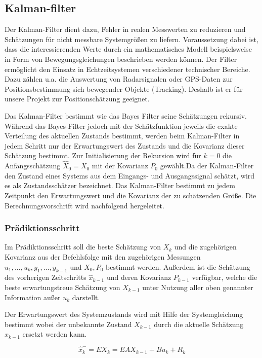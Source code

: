 \clearpage
\subsection{Kalman-filter}

Der Kalman-Filter dient dazu, Fehler in realen Messwerten zu reduzieren und Schätzungen für nicht messbare Systemgrößen zu liefern. Voraussetzung dabei ist, dass die interessierenden Werte durch ein mathematisches Modell beispielsweise in Form von Bewegungsgleichungen beschrieben werden können. Der Filter ermöglicht den Einsatz in Echtzeitsystemen verschiedener technischer Bereiche. Dazu zählen u.a. die Auswertung von Radarsignalen oder GPS-Daten zur Positionsbestimmung sich bewegender Objekte (Tracking). Deshalb ist er für unsere Projekt zur Positionschätzung geeignet. 
 
Das Kalman-Filter bestimmt wie das Bayes Filter seine Schätzungen rekursiv. Während das Bayes-Filter jedoch mit der Schätzfunktion jeweils die exakte Verteilung des aktuellen Zustands bestimmt, werden beim Kalman-Filter in jedem Schritt nur der Erwartungswert des Zustands und die Kovarianz dieser Schätzung bestimmt. Zur Initialisierung der Rekursion wird für $k = 0$ die Anfangsschätzung $\widehat{X}_{0}=X_0 $ mit der Kovarianz $P_{0}$ gewählt.Da der Kalman-Filter den Zustand eines Systems aus dem Eingangs- und Ausgangssignal schätzt, wird es als Zustandsschätzer bezeichnet. Das Kalman-Filter bestimmt zu jedem Zeitpunkt den Erwartungswert und die Kovarianz der zu schätzenden Größe. Die Berechnungsvorschrift wird nachfolgend hergeleitet.

\subsubsection{Prädiktionsschritt }
Im Prädiktionsschritt soll die beste Schätzung von $X_{k}$ und die zugehörigen Kovarianz aus der Befehlsfolge mit den zugehörigen Messungen $u_{1},...,u_{k},y_{1},...,y_{k-1} $ und $X_{0},P_{0}$ bestimmt werden. Außerdem ist die Schätzung des vorherigen Zeitschritts $\widehat{x}_{k-1}$ und deren Kovarianz $P_{k-1}$ verfügbar, welche die beste erwartungstreue Schätzung von $X_{k-1}$ unter Nutzung aller oben genannter Information außer $u_{k}$ darstellt.

Der Erwartungswert des Systemzustands wird mit Hilfe der Systemgleichung bestimmt wobei der unbekannte Zustand $X_{k-1}$ durch die aktuelle Schätzung $\widehat{x}_{k-1}$ ersetzt werden kann.

\begin{equation}
\tag{3.1}
\widehat{x}_{k}^{-}=E{X_{k}}=E{AX_{k-1}+Bu_{k}+R_{k}}
\end{equation}

